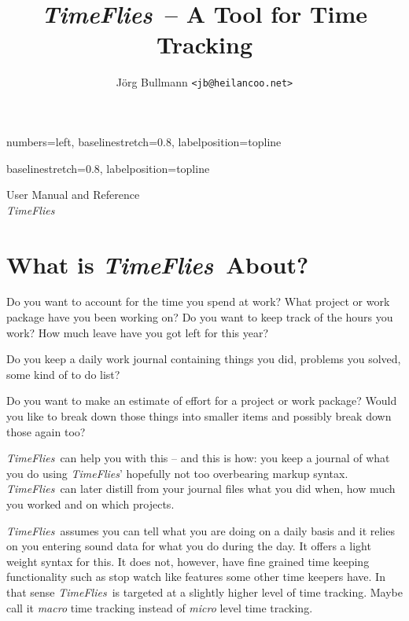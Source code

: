 \documentclass[11pt]{article}
\newcommand{\timeflies}{\emph{TimeFlies}}
\begin{document}
   {numbers=left,
    baselinestretch=0.8,
    labelposition=topline}

   {baselinestretch=0.8,
    labelposition=topline}


\title{\timeflies\ -- A Tool for Time Tracking}
\author{J\"org Bullmann \tt<jb@heilancoo.net>}
\maketitle
\begin{center}
User Manual and Reference\\
\timeflies\ 
\end{center}
\newpage
\tableofcontents
\newpage

\section{What is \timeflies\ About?}

Do you want to account for the time you spend at work? What project or work package have you been working on? Do you want to keep track of the hours you work? How much leave have you got left for this year?

Do you keep a daily work journal containing things you did, problems you solved, some kind of to do list?

Do you want to make an estimate of effort for a project or work package? Would you like to break down those things into smaller items and possibly break down those again too?

\timeflies\ can help you with this -- and this is how: you keep a journal of what you do using \timeflies' hopefully not too overbearing markup syntax. \timeflies\ can later distill from your journal files what you did when, how much you worked and on which projects.

\timeflies\ assumes you can tell what you are doing on a daily basis and it relies on you entering sound data for what you do during the day. It offers a light weight syntax for this. It does not, however, have fine grained time keeping functionality such as stop watch like features some other time keepers have. In that sense \timeflies\ is targeted at a slightly higher level of time tracking. Maybe call it \emph{macro} time tracking instead of \emph{micro} level time tracking. 
\end{document}
